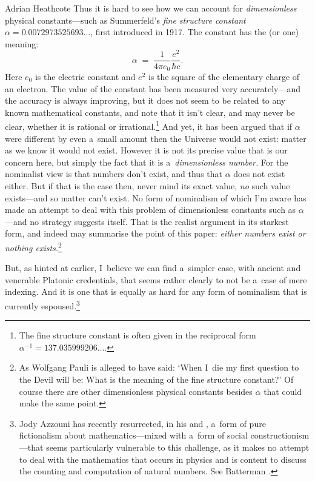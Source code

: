 \begin{artengenv}{Adrian Heathcote}
Thus it is hard to see how we can account for \textit{dimensionless} physical constants---such as Summerfeld's \textit{fine structure constant} $\alpha = 0.0072973525693\ldots$, first introduced in 1917. The constant has the (or one) meaning:
\[ \alpha\; =\; \frac{1}{4 \pi e_{0}} \frac{e^{2}}{\hbar c}.  \]
Here $e_{0}$ is the electric constant and $e^{2}$ is the square of the elementary charge of an electron. The value of the constant has been measured very accurately---and the accuracy is always improving, but it does not seem to be related to any known mathematical constants, and note that it isn't clear, and may never be clear, whether it is rational or irrational.\footnote{The fine structure constant is often given in the reciprocal form $\alpha^{-1} = 137.035999206\ldots$.} And yet, it has been argued that if $\alpha$ were different by even a~small amount then the Universe would not exist: matter as we know it would not exist. However it is not its precise value that is our concern here, but simply the fact that it is a~\textit{dimensionless number.} For the nominalist view is that numbers don't exist, and thus that $\alpha$ does not exist either. But if that is the case then, never mind its exact value, \textit{no} such value exists---and so matter can't exist. No form of nominalism of which I'm aware has made an attempt to deal with this problem of dimensionless constants such as $\alpha$---and no strategy suggests itself. That is the realist argument in its starkest form, and indeed may summarise the point of this paper: \textit{either numbers exist or nothing exists.}\footnote{As Wolfgang Pauli is alleged to have said: `When I~die my first question to the Devil will be: What is the meaning of the fine structure constant?' Of course there are other dimensionless physical constants besides $\alpha$ that could make the same point.}


But, as hinted at earlier, I~believe we can find a~simpler case, with ancient and venerable Platonic credentials, that seems rather clearly to not be a~case of mere indexing. And it is one that is equally as hard for any form of nominalism that is currently espoused.\footnote{Jody Azzouni has recently resurrected, in his \parencite*{azzouni_deflating_2006} and \parencite{azzouni_talking_2010}, a~form of pure fictionalism about mathematics---mixed with a~form of social constructionism---that seems particularly vulnerable to this challenge, as it makes no attempt to deal with the mathematics that occurs in physics and is content to discuss the counting and computation of natural numbers. See Batterman \parencite{batterman_explanatory_2010}.}


\end{artengenv}
